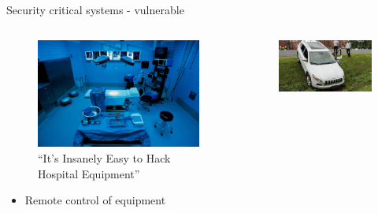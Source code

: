 \documentclass{beamer}
\begin{document}
\begin{frame}{Security critical systems - vulnerable}
    \pause
    \begin{columns}
        \begin{column}{0.5\textwidth}
            \begin{figure}
                \centering
                \includegraphics[height=.3\textheight]{figures/hospital-hacking.jpg}
                \caption{``It's Insanely Easy to Hack Hospital Equipment'' \cite{zetter_its_2014}}
                \label{hack_hospital}
            \end{figure}
            \pause
            \begin{itemize}
                \item Remote control of equipment
            \end{itemize}
        \end{column}
        \pause
        \begin{column}{0.5\textwidth}
            \begin{figure}
                \centering
                \includegraphics[height=.3\textheight]{figures/jeep_offroad.jpg}

\end{figure}
\end{column}
\end{columns}
\end{frame}
\end{document}

